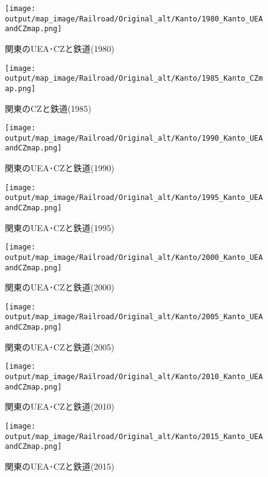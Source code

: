 \documentclass{ltjsarticle}
\begin{document}
\begin{figure}[pbth]
  \centering
  \texttt{[image: output/map\_image/Railroad/Original\_alt/Kanto/1980\_Kanto\_UEAandCZmap.png]}
  \caption{\label{alt:1980:KanCZandUEA:Rail}関東のUEA･CZと鉄道(1980)}
\end{figure}


\begin{figure}[pbth]
  \centering
  \texttt{[image: output/map\_image/Railroad/Original\_alt/Kanto/1985\_Kanto\_CZmap.png]}
  \caption{\label{alt:1985:KanCZandUEA:Rail}関東のCZと鉄道(1985)}
\end{figure}


\begin{figure}[pbth]
  \centering
  \texttt{[image: output/map\_image/Railroad/Original\_alt/Kanto/1990\_Kanto\_UEAandCZmap.png]}
  \caption{\label{alt:1990:KanCZandUEA:Rail}関東のUEA･CZと鉄道(1990)}
\end{figure}


\begin{figure}[pbth]
  \centering
  \texttt{[image: output/map\_image/Railroad/Original\_alt/Kanto/1995\_Kanto\_UEAandCZmap.png]}
  \caption{\label{alt:1995:KanCZandUEA:Rail}関東のUEA･CZと鉄道(1995)}
\end{figure}


\begin{figure}[pbth]
  \centering
  \texttt{[image: output/map\_image/Railroad/Original\_alt/Kanto/2000\_Kanto\_UEAandCZmap.png]}
  \caption{\label{alt:2000:KanCZandUEA:Rail}関東のUEA･CZと鉄道(2000)}
\end{figure}


\begin{figure}[pbth]
  \centering
  \texttt{[image: output/map\_image/Railroad/Original\_alt/Kanto/2005\_Kanto\_UEAandCZmap.png]}
  \caption{\label{alt:2005:KanCZandUEA:Rail}関東のUEA･CZと鉄道(2005)}
\end{figure}


\begin{figure}[pbth]
  \centering
  \texttt{[image: output/map\_image/Railroad/Original\_alt/Kanto/2010\_Kanto\_UEAandCZmap.png]}
  \caption{\label{alt:2010:KanCZandUEA:Rail}関東のUEA･CZと鉄道(2010)}
\end{figure}


\begin{figure}[pbth]
  \centering
  \texttt{[image: output/map\_image/Railroad/Original\_alt/Kanto/2015\_Kanto\_UEAandCZmap.png]}
  \caption{\label{alt:2015:KanCZandUEA:Rail}関東のUEA･CZと鉄道(2015)}
\end{figure}
\end{document}
